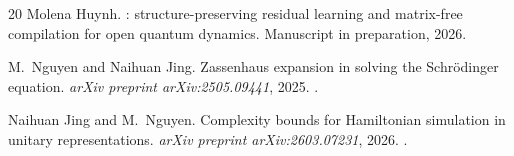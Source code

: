 \documentclass[
  aps,
  prresearch,
  reprint,
  amsmath,
  amssymb,
  nofootinbib,
  floatfix,
]{revtex4-2}
\begin{document}
\begin{thebibliography}{20}
Molena Huynh.
: structure-preserving residual learning and
  matrix-free compilation for open quantum dynamics.
\newblock Manuscript in preparation, 2026.

M.~Nguyen and Naihuan Jing.
\newblock Zassenhaus expansion in solving the {Schr\"odinger} equation.
\newblock \emph{arXiv preprint arXiv:2505.09441}, 2025.
\newblock {}.

Naihuan Jing and M.~Nguyen.
\newblock Complexity bounds for {Hamiltonian} simulation in unitary
  representations.
\newblock \emph{arXiv preprint arXiv:2603.07231}, 2026.
\newblock {}.

\end{thebibliography}
\end{document}
